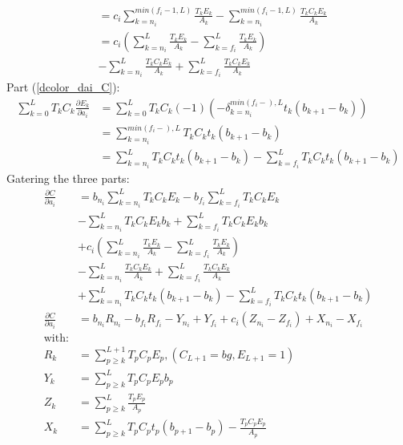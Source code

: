 \documentclass{article}
\begin{document}
\begin{appendices}
\begin{align}
                                                                 & = c_i \sum_{k=n_i}^{min(f_i-1,L)} \frac{T_k E_k}{A_k} - \sum_{k=n_i}^{min(f_i-1,L)} \frac{T_k C_k E_k}{A_k} \nonumber \\
                                                                 & = c_i (\sum_{k=n_i}^{L} \frac{T_k E_k}{A_k} - \sum_{k=f_i}^{L} \frac{T_k E_k}{A_k}) \nonumber \\
                                                                 & - \sum_{k=n_i}^{L} \frac{T_k C_k E_k}{A_k} + \sum_{k=f_i}^{L} \frac{T_k C_k E_k}{A_k} \nonumber
    \end{align}
    Part (\ref{dcolor_dai_C}):
    \begin{align}
        \sum_{k=0}^{L} T_k C_k \frac{\partial E_k}{\partial a_i} & = \sum_{k=0}^{L} T_k C_k (-1) (- \delta_{k=n_i}^{min(f_i-),L} t_k (b_{k+1}-b_k)) \nonumber \\
                                                                 & = \sum_{k=n_i}^{min(f_i-),L} T_k C_k t_k (b_{k+1}-b_k) \nonumber \\
                                                                 & = \sum_{k=n_i}^{L} T_k C_k t_k (b_{k+1}-b_k) - \sum_{k=f_i}^{L} T_k C_k t_k (b_{k+1}-b_k) \nonumber
    \end{align}
    Gatering the three parts:
    \begin{align}
        \frac{\partial C}{\partial a_i} & = b_{n_i} \sum_{k=n_i}^{L} T_k C_k E_k - b_{f_i} \sum_{k = f_i}^{L} T_k C_k E_k \nonumber \\
                                        & - \sum_{k=n_i}^{L} T_k C_k E_k b_k + \sum_{k=f_i}^{L} T_k C_k E_k b_k \nonumber \\
                                        & + c_i (\sum_{k=n_i}^{L} \frac{T_k E_k}{A_k} - \sum_{k=f_i}^{L} \frac{T_k E_k}{A_k}) \nonumber \\
                                        & - \sum_{k=n_i}^{L} \frac{T_k C_k E_k}{A_k} + \sum_{k=f_i}^{L} \frac{T_k C_k E_k}{A_k} \nonumber \\
                                        & + \sum_{k=n_i}^{L} T_k C_k t_k (b_{k+1}-b_k) - \sum_{k=f_i}^{L} T_k C_k t_k (b_{k+1}-b_k) \nonumber \\
        \frac{\partial C}{\partial a_i} & = b_{n_i} R_{n_i} - b_{f_i} R_{f_i} - Y_{n_i} + Y_{f_i} + c_i (Z_{n_i} - Z_{f_i}) + X_{n_i} - X_{f_i} \label{dcolor_dai} \\
        \text{with:} \nonumber \\
        R_k & = \sum_{p \geq k}^{L+1} T_p C_p E_p, (C_{L+1}=bg, E_{L+1} = 1) \nonumber \\
        Y_k & = \sum_{p \geq k}^{L} T_p C_p E_p b_p \nonumber \\
        Z_k & = \sum_{p \geq k}^{L} \frac{T_p E_p}{A_p} \nonumber \\
        X_k & = \sum_{p \geq k}^{L} T_p C_p t_p (b_{p+1}-b_p) - \frac{T_p C_p E_p}{A_p}\nonumber
        \end{align}


\end{appendices}
\end{document}
